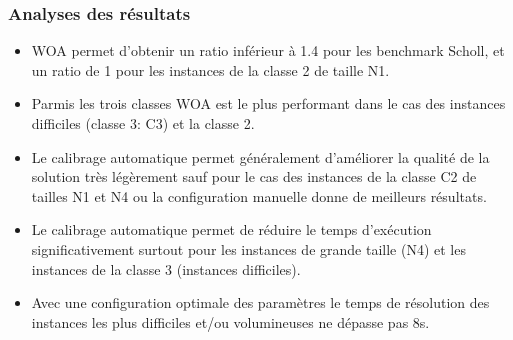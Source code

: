 \documentclass[12pt]{article}
\begin{document}
\subsubsection{Analyses des résultats }
\begin{itemize}
    \item WOA permet d'obtenir un ratio inférieur à 1.4 pour les benchmark Scholl, et un ratio de 1 pour les instances de la classe 2 de taille N1.
    \item Parmis les trois classes WOA est le plus performant dans le cas des instances difficiles (classe 3: C3) et la classe 2.
    \item Le calibrage automatique permet généralement d’améliorer la qualité de la solution très légèrement sauf pour le cas des instances de la classe C2 de tailles N1 et N4 ou la configuration manuelle donne de meilleurs résultats.
    \item Le calibrage automatique permet de réduire le temps d’exécution significativement surtout pour les instances de grande taille (N4) et les instances de la classe 3 (instances difficiles).
    \item Avec une configuration optimale des paramètres le temps de résolution des instances les plus difficiles et/ou volumineuses ne dépasse pas 8s.
\end{itemize}
\end{document}
